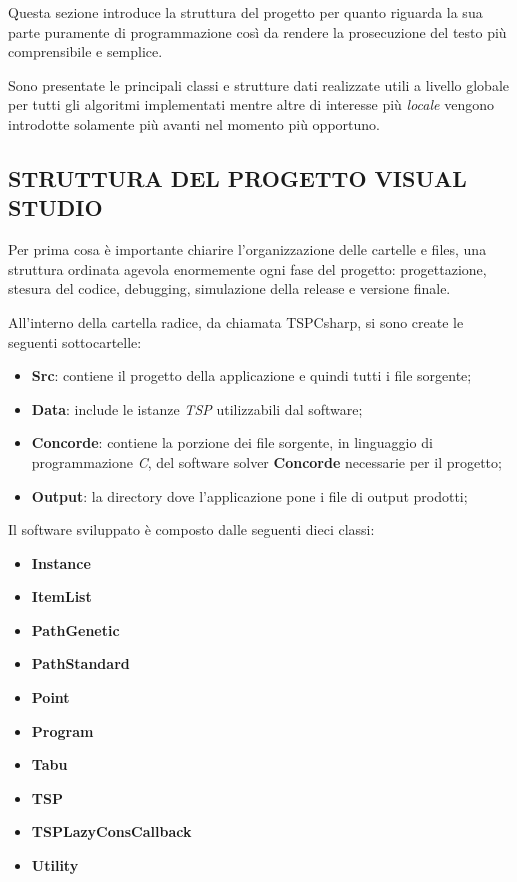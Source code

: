 \documentclass[11pt]{article}
\begin{document}
Questa sezione introduce la struttura del progetto per quanto riguarda la sua parte puramente di programmazione così da rendere la prosecuzione del testo più comprensibile e semplice.

Sono presentate le principali classi e strutture dati realizzate utili a livello globale per tutti gli algoritmi implementati mentre altre di interesse più \textit{locale} vengono introdotte solamente più avanti nel momento più opportuno.

\subsection*{STRUTTURA DEL PROGETTO VISUAL STUDIO}
\label{sec:StrutturaProgettoVSS}

Per prima cosa è importante chiarire l'organizzazione delle cartelle e files, una struttura ordinata agevola enormemente ogni fase del progetto: progettazione, stesura del codice, debugging, simulazione della release e versione finale.

All'interno della cartella radice, da chiamata TSPCsharp, si sono create le seguenti sottocartelle:

\begin{itemize}
    \item \textbf{Src}: contiene il progetto della applicazione e quindi tutti i file sorgente;
    \item \textbf{Data}: include le istanze \textit{TSP} utilizzabili dal software;
    \item \textbf{Concorde}: contiene la porzione dei file sorgente, in linguaggio di programmazione \textit{C}, del software solver \textbf{Concorde} necessarie per il progetto;
    \item \textbf{Output}: la directory dove l'applicazione pone i file di output prodotti;
\end{itemize}

Il software sviluppato è composto dalle seguenti dieci classi:

\begin{itemize}
    \item \textbf{Instance}
    \item \textbf{ItemList}
    \item \textbf{PathGenetic}
    \item \textbf{PathStandard}
    \item \textbf{Point}
    \item \textbf{Program}
    \item \textbf{Tabu}
    \item \textbf{TSP}
    \item \textbf{TSPLazyConsCallback}
    \item \textbf{Utility}
\end{itemize}
\end{document}
